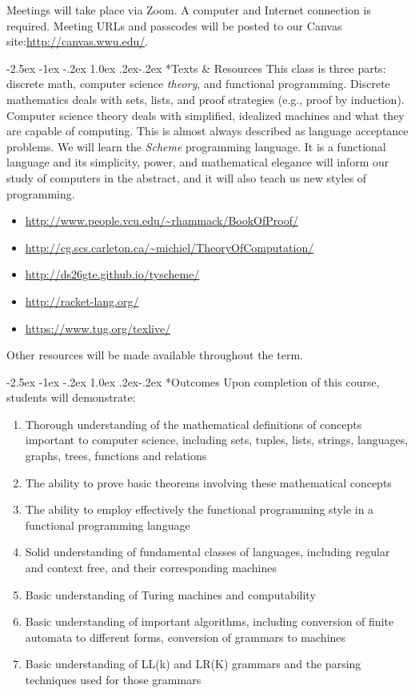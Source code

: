 \documentclass[letterpaper,12pt]{article}
\makeatletter
\renewcommand\section{%
  \@startsection {section}{1}{\z@}%
  {-2.5ex \@plus -1ex \@minus -.2ex}%
  {1.0ex \@plus.2ex\@minus-.2ex}%
  {\normalfont\Large\bfseries}}
\makeatother
\begin{document}
Meetings will take place via Zoom.  A computer and Internet connection is
required.  Meeting URLs and passcodes will be posted to our Canvas
site:\url{http://canvas.wwu.edu/}.

\section*{Texts \& Resources}
This class is three parts: discrete math, computer science \emph{theory}, and
functional programming.  Discrete mathematics deals with sets, lists, and proof
strategies (e.g., proof by induction).  Computer science theory deals with
simplified, idealized machines and what they are capable of computing.  This is
almost always described as language acceptance problems.  We will learn the
\emph{Scheme} programming language.  It is a functional language and its
simplicity, power, and mathematical elegance will inform our study of computers
in the abstract, and it will also teach us new styles of programming.

\begin{itemize}\setlength{\parskip}{0ex}
\item \url{http://www.people.vcu.edu/~rhammack/BookOfProof/}
\item \url{http://cg.scs.carleton.ca/~michiel/TheoryOfComputation/}
\item \url{http://ds26gte.github.io/tyscheme/}
\item \url{http://racket-lang.org/}
\item \url{https://www.tug.org/texlive/}
\end{itemize}

Other resources will be made available throughout the term.  

\section*{Outcomes}
Upon completion of this course, students will demonstrate:
\begin{enumerate}\setlength{\parskip}{0ex}
\item
  Thorough understanding of the mathematical definitions of concepts important
  to computer science, including sets, tuples, lists, strings, languages,
  graphs, trees, functions and relations
\item
  The ability to prove basic theorems involving these mathematical concepts
\item
  The ability to employ effectively the functional programming style in a
  functional programming language
\item
  Solid understanding of fundamental classes of languages, including regular and
  context free, and their corresponding machines
\item
  Basic understanding of Turing machines and computability
\item
  Basic understanding of important algorithms, including conversion of finite
  automata to different forms, conversion of grammars to machines
\item
  Basic understanding of LL(k) and LR(K) grammars and the parsing techniques
  used for those grammars
\end{enumerate}
\end{document}
